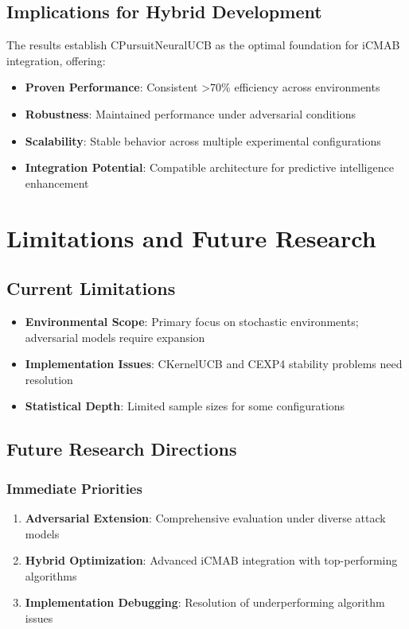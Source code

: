 \documentclass[12pt,a4paper]{article}
\begin{document}
\subsection{Implications for Hybrid Development}

The results establish CPursuitNeuralUCB as the optimal foundation for iCMAB integration, offering:

\begin{itemize}
\item \textbf{Proven Performance}: Consistent >70\% efficiency across environments
\item \textbf{Robustness}: Maintained performance under adversarial conditions
\item \textbf{Scalability}: Stable behavior across multiple experimental configurations
\item \textbf{Integration Potential}: Compatible architecture for predictive intelligence enhancement
\end{itemize}

\section{Limitations and Future Research}

\subsection{Current Limitations}

\begin{itemize}
\item \textbf{Environmental Scope}: Primary focus on stochastic environments; adversarial models require expansion
\item \textbf{Implementation Issues}: CKernelUCB and CEXP4 stability problems need resolution
\item \textbf{Statistical Depth}: Limited sample sizes for some configurations
\end{itemize}

\subsection{Future Research Directions}

\subsubsection{Immediate Priorities}
\begin{enumerate}
\item \textbf{Adversarial Extension}: Comprehensive evaluation under diverse attack models
\item \textbf{Hybrid Optimization}: Advanced iCMAB integration with top-performing algorithms
\item \textbf{Implementation Debugging}: Resolution of underperforming algorithm issues
\end{enumerate}
\end{document}
